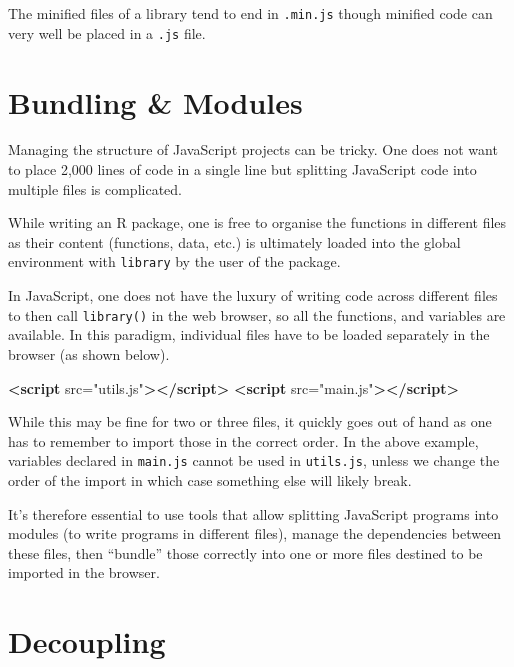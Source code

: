 \documentclass[
  10pt,
]{krantz}
\makeatletter
\newenvironment{Shaded}{\begin{snugshade}}{\end{snugshade}}
\newcommand{\KeywordTok}[1]{\textcolor[rgb]{0.27,0.27,0.27}{\textbf{#1}}}
\newcommand{\OtherTok}[1]{\textcolor[rgb]{0.37,0.37,0.37}{#1}}
\newcommand{\StringTok}[1]{\textcolor[rgb]{0.5,0.5,0.5}{#1}}
\newenvironment{kframe}{%
\medskip{}
\setlength{\fboxsep}{.8em}
 \def\at@end@of@kframe{}%
 \ifinner\ifhmode%
  \def\at@end@of@kframe{\end{minipage}}%
  \begin{minipage}{\columnwidth}%
 \fi\fi%
 \def\FrameCommand##1{\hskip\@totalleftmargin \hskip-\fboxsep
 \colorbox{shadecolor}{##1}\hskip-\fboxsep
     \hskip-\linewidth \hskip-\@totalleftmargin \hskip\columnwidth}%
 \MakeFramed {\advance\hsize-\width
   \@totalleftmargin\z@ \linewidth\hsize
   \@setminipage}}%
 {\par\unskip\endMakeFramed%
 \at@end@of@kframe}
\renewenvironment{Shaded}{\begin{kframe}}{\end{kframe}}
\makeatother
\begin{document}
The minified files of a library tend to end in \texttt{.min.js} though minified code can very well be placed in a \texttt{.js} file.

\hypertarget{webpack-structure}{%
\section{Bundling \& Modules}\label{webpack-structure}}

Managing the structure of JavaScript projects can be tricky. One does not want to place 2,000 lines of code in a single line but splitting JavaScript code into multiple files is complicated.

While writing an R package, one is free to organise the functions in different files as their content (functions, data, etc.) is ultimately loaded into the global environment with \texttt{library} by the user of the package.

In JavaScript, one does not have the luxury of writing code across different files to then call \texttt{library()} in the web browser, so all the functions, and variables are available. In this paradigm, individual files have to be loaded separately in the browser (as shown below).

\begin{Shaded}
\begin{Highlighting}[]
\KeywordTok{<script}\OtherTok{ src=}\StringTok{"utils.js"}\KeywordTok{></script>}
\KeywordTok{<script}\OtherTok{ src=}\StringTok{"main.js"}\KeywordTok{></script>}
\end{Highlighting}
\end{Shaded}

While this may be fine for two or three files, it quickly goes out of hand as one has to remember to import those in the correct order. In the above example, variables declared in \texttt{main.js} cannot be used in \texttt{utils.js}, unless we change the order of the import in which case something else will likely break.

It's therefore essential to use tools that allow splitting JavaScript programs into modules (to write programs in different files), manage the dependencies between these files, then ``bundle'' those correctly into one or more files destined to be imported in the browser.

\hypertarget{webpack-decouple}{%
\section{Decoupling}\label{webpack-decouple}}
\end{document}
